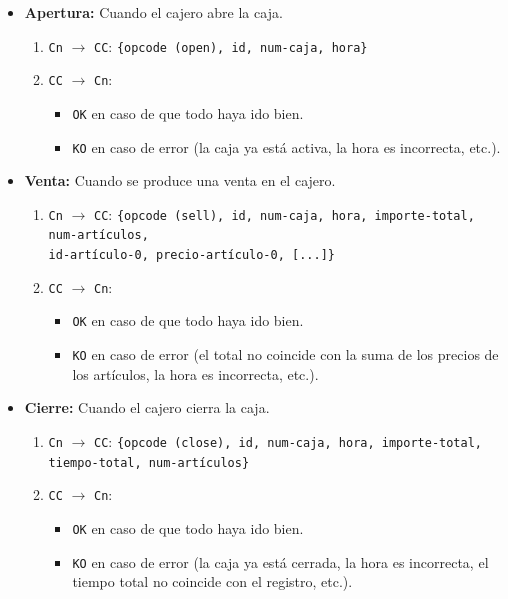 \begin{itemize}
    \item \textbf{Apertura:} Cuando el cajero abre la caja.
    \begin{enumerate}
        \item \texttt{Cn} $\rightarrow$ \texttt{CC}: \texttt{\{opcode (open), id, num-caja, hora\}}
        \item \texttt{CC} $\rightarrow$ \texttt{Cn}: 
        \begin{itemize}
            \item \texttt{OK} en caso de que todo haya ido bien.
            \item \texttt{KO} en caso de error (la caja ya está activa, la hora es incorrecta, etc.).
        \end{itemize}
    \end{enumerate}

    \item \textbf{Venta:} Cuando se produce una venta en el cajero.
    \begin{enumerate}
        \item \texttt{Cn} $\rightarrow$ \texttt{CC}: \texttt{\{opcode (sell), id, num-caja, hora, importe-total, num-artículos,\\
        id-artículo-0, precio-artículo-0, [...]\}}
        \item \texttt{CC} $\rightarrow$ \texttt{Cn}: 
        \begin{itemize}
            \item \texttt{OK} en caso de que todo haya ido bien.
            \item \texttt{KO} en caso de error (el total no coincide con la suma de los precios de los artículos, la hora es incorrecta, etc.).
        \end{itemize}
    \end{enumerate}
    
    \item \textbf{Cierre:} Cuando el cajero cierra la caja.
    \begin{enumerate}
        \item \texttt{Cn} $\rightarrow$ \texttt{CC}: \texttt{\{opcode (close), id, num-caja, hora, importe-total,\\
        tiempo-total, num-artículos\}}
        \item \texttt{CC} $\rightarrow$ \texttt{Cn}: 
        \begin{itemize}
            \item \texttt{OK} en caso de que todo haya ido bien.
            \item \texttt{KO} en caso de error (la caja ya está cerrada, la hora es incorrecta, el tiempo total no coincide con el registro, etc.).
        \end{itemize}
    \end{enumerate}
    

\end{itemize}
